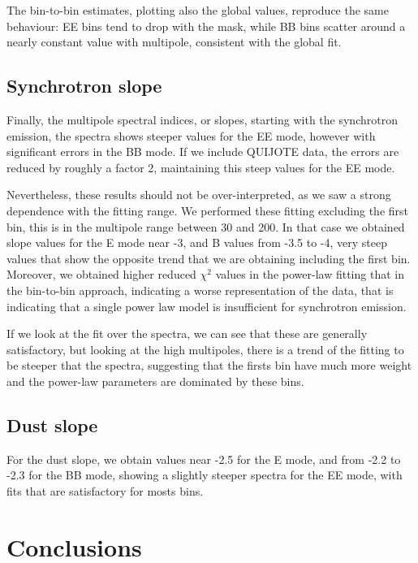 \documentclass[12pt,a4paper]{article}
\begin{document}
The bin-to-bin estimates, plotting also the global values, reproduce the same behaviour: EE bins tend to drop with the mask, while BB bins scatter around a nearly constant value with multipole, consistent with the global fit.

\subsection{Synchrotron slope}

Finally, the multipole spectral indices, or slopes, starting with the synchrotron emission, the spectra shows steeper values for the EE mode, however with significant errors in the BB mode. If we include QUIJOTE data, the errors are reduced by roughly a factor 2, maintaining this steep values for the EE mode.

Nevertheless, these results should not be over-interpreted, as we saw a strong dependence with the fitting range. We performed these fitting excluding the first bin, this is in the multipole range between 30 and 200. In that case we obtained slope values for the E mode near -3, and B values from -3.5 to -4, very steep values that show the opposite trend that we are obtaining including the first bin. Moreover, we obtained higher reduced $\chi^{2}$ values in the power-law fitting that in the bin-to-bin approach, indicating a worse representation of the data, that is indicating that a single power law model is insufficient for synchrotron emission.


If we look at the fit over the spectra, we can see that these are generally satisfactory, but looking at the high multipoles, there is a trend of the fitting to be steeper that the spectra, suggesting that the firsts bin have much more weight and the power-law parameters are dominated by these bins.  



\subsection{Dust slope}

For the dust slope, we obtain values near -2.5 for the E mode, and from -2.2 to -2.3 for the BB mode, showing a slightly steeper spectra for the EE mode, with fits that are satisfactory for mosts bins.

\section{Conclusions}
\end{document}
